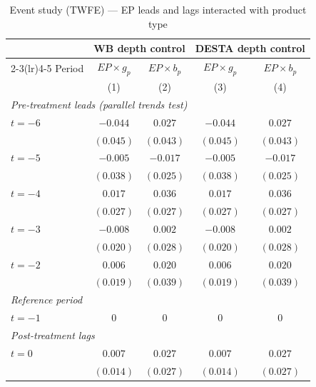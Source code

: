 \documentclass{article}
\begin{document}
\begin{table}[htbp]
\centering
\footnotesize
\setlength{\tabcolsep}{5pt}
\caption{Event study (TWFE) --- EP leads and lags interacted with product type}
\label{tab:eventstudy_twfe}
\begin{threeparttable}
\begin{tabular}{lcccc}
\toprule
 & \multicolumn{2}{c}{WB depth control} & \multicolumn{2}{c}{DESTA depth control} \\
\cmidrule(lr){2-3}\cmidrule(lr){4-5}
Period & $EP \times g_p$ & $EP \times b_p$ & $EP \times g_p$ & $EP \times b_p$ \\
       & (1)             & (2)             & (3)             & (4)             \\
\midrule
\multicolumn{5}{l}{\textit{Pre-treatment leads (parallel trends test)}} \\[3pt]
$t=-6$ & $-0.044$        & $0.027$         & $-0.044$        & $0.027$         \\
       & $(0.045)$       & $(0.043)$       & $(0.045)$       & $(0.043)$       \\[4pt]
$t=-5$ & $-0.005$        & $-0.017$        & $-0.005$        & $-0.017$        \\
       & $(0.038)$       & $(0.025)$       & $(0.038)$       & $(0.025)$       \\[4pt]
$t=-4$ & $0.017$         & $0.036$         & $0.017$         & $0.036$         \\
       & $(0.027)$       & $(0.027)$       & $(0.027)$       & $(0.027)$       \\[4pt]
$t=-3$ & $-0.008$        & $0.002$         & $-0.008$        & $0.002$         \\
       & $(0.020)$       & $(0.028)$       & $(0.020)$       & $(0.028)$       \\[4pt]
$t=-2$ & $0.006$         & $0.020$         & $0.006$         & $0.020$         \\
       & $(0.019)$       & $(0.039)$       & $(0.019)$       & $(0.039)$       \\[4pt]
\midrule
\multicolumn{5}{l}{\textit{Reference period}} \\[3pt]
$t=-1$ & $0$             & $0$             & $0$             & $0$             \\[4pt]
\midrule
\multicolumn{5}{l}{\textit{Post-treatment lags}} \\[3pt]
$t=0$  & $0.007$         & $0.027$         & $0.007$         & $0.027$         \\
       & $(0.014)$       & $(0.027)$       & $(0.014)$       & $(0.027)$       \\[4pt]

\end{tabular}
\end{threeparttable}
\end{table}
\end{document}
